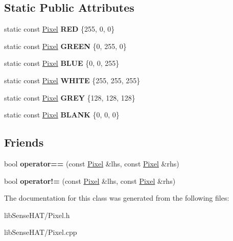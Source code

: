 \subsection*{Static Public Attributes}
\begin{DoxyCompactItemize}
\item 
\mbox{\label{class_pixel_a0873aef3100f5b2400ee7ca185bf263a}} 
static const \mbox{\hyperlink{class_pixel}{Pixel}} {\bfseries R\+ED} \{255, 0, 0\}
\item 
\mbox{\label{class_pixel_af1e95f87b82dedb916c81f427b3eb68a}} 
static const \mbox{\hyperlink{class_pixel}{Pixel}} {\bfseries G\+R\+E\+EN} \{0, 255, 0\}
\item 
\mbox{\label{class_pixel_a64e919862b4e618715e6d6dba7671112}} 
static const \mbox{\hyperlink{class_pixel}{Pixel}} {\bfseries B\+L\+UE} \{0, 0, 255\}
\item 
\mbox{\label{class_pixel_a12c08beec64c8d57bdd9ef3b49244aa3}} 
static const \mbox{\hyperlink{class_pixel}{Pixel}} {\bfseries W\+H\+I\+TE} \{255, 255, 255\}
\item 
\mbox{\label{class_pixel_a67edde6c97818a595235295f750b50fd}} 
static const \mbox{\hyperlink{class_pixel}{Pixel}} {\bfseries G\+R\+EY} \{128, 128, 128\}
\item 
\mbox{\label{class_pixel_a77c8aab7dad0995df6fdc8ccf65e92ee}} 
static const \mbox{\hyperlink{class_pixel}{Pixel}} {\bfseries B\+L\+A\+NK} \{0, 0, 0\}
\end{DoxyCompactItemize}
\subsection*{Friends}
\begin{DoxyCompactItemize}
\item 
\mbox{\label{class_pixel_aacd4ab1e37e7b6507b3580d2a3cd0fd9}} 
bool {\bfseries operator==} (const \mbox{\hyperlink{class_pixel}{Pixel}} \&lhs, const \mbox{\hyperlink{class_pixel}{Pixel}} \&rhs)
\item 
\mbox{\label{class_pixel_a96c765b304a1ef8aad3e454b02d21de5}} 
bool {\bfseries operator!=} (const \mbox{\hyperlink{class_pixel}{Pixel}} \&lhs, const \mbox{\hyperlink{class_pixel}{Pixel}} \&rhs)
\end{DoxyCompactItemize}


The documentation for this class was generated from the following files\+:\begin{DoxyCompactItemize}
\item 
lib\+Sense\+H\+A\+T/Pixel.\+h\item 
lib\+Sense\+H\+A\+T/Pixel.\+cpp\end{DoxyCompactItemize}
